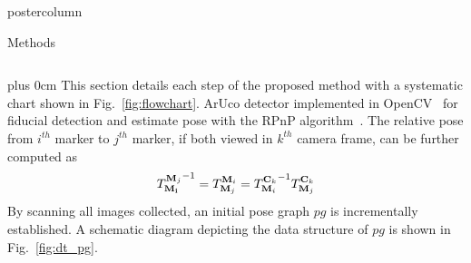 \documentclass{beamer}
\renewcommand{\raggedright}{\leftskip=0pt \rightskip=0pt plus 0cm}
\begin{document}
\begin{frame}
\begin{columns}
\begin{column}{.57\textwidth}
\begin{beamercolorbox}[center]{postercolumn}
\begin{minipage}{.98\textwidth}
{\begin{myblock}{Methods}
\vspace{1em}
\begin{minipage}[0.3\textheight]{\textwidth}
	\begin{columns}[T]
		\begin{column}{0.5\textwidth}
			\raggedright
This section details each step of the proposed method with a systematic chart shown in Fig.~\ref{fig:flowchart}.
%
ArUco detector implemented in OpenCV~\cite{aurcodetector} for fiducial detection and estimate pose with the RPnP algorithm~\cite{li2012robust}. The relative pose from $i^{th}$ marker to $j^{th}$ marker, if both viewed in $k^{th}$ camera frame, can be further computed as
\begin{equation}
{T_{\bold{M_i}}^{\bold{M}_j}}^{-1} = {T_{\bold{M}_j}^{\bold{M}_i}} = {T_{\bold{M}_i}^{\bold{C}_k}}^{-1}T_{\bold{M}_j}^{\bold{C}_k}
\end{equation}
By scanning all images collected, an initial pose graph $pg$ is incrementally established. A schematic diagram depicting the data structure of $pg$ is shown in Fig.~\ref{fig:dt_pg}.  


\end{column}
\end{columns}
\end{minipage}
\end{myblock}}
\end{minipage}
\end{beamercolorbox}
\end{column}
\end{columns}
\end{frame}
\end{document}
